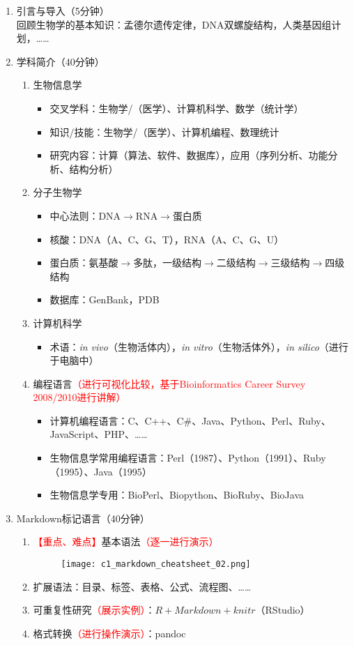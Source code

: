 \documentclass{TIJMUjiaoanLL}
\begin{document}
\begin{enumerate}
  \item 引言与导入（5分钟）
    \\回顾生物学的基本知识：孟德尔遗传定律，DNA双螺旋结构，人类基因组计划，……
  \item 学科简介（40分钟）
    \begin{enumerate}
      \item 生物信息学
	\begin{itemize}
    \item 交叉学科：生物学/（医学）、计算机科学、数学（统计学）
	  \item 知识/技能：生物学/（医学）、计算机编程、数理统计
	  \item 研究内容：计算（算法、软件、数据库），应用（序列分析、功能分析、结构分析）
	\end{itemize}
      \item 分子生物学
	\begin{itemize}
	  \item 中心法则：DNA$\rightarrow$RNA$\rightarrow$蛋白质
	  \item 核酸：DNA（A、C、G、T），RNA（A、C、G、U）
	  \item 蛋白质：氨基酸$\rightarrow$多肽，一级结构$\rightarrow$二级结构$\rightarrow$三级结构$\rightarrow$四级结构
	  \item 数据库：GenBank，PDB
	\end{itemize}
      \item 计算机科学
	\begin{itemize}
	  \item 术语：\textit{in vivo}（生物活体内），\textit{in vitro}（生物活体外），\textit{in silico}（进行于电脑中）
	\end{itemize}
      \item 编程语言\textcolor{red}{（进行可视化比较，基于Bioinformatics Career Survey 2008/2010进行讲解）}
	\begin{itemize}
	  \item 计算机编程语言：C、C++、C\#、Java、Python、Perl、Ruby、JavaScript、PHP、……
	  \item 生物信息学常用编程语言：Perl（1987）、Python（1991）、Ruby（1995）、Java（1995）
	  \item 生物信息学专用：BioPerl、Biopython、BioRuby、BioJava
	\end{itemize}
    \end{enumerate}
  \item Markdown标记语言（40分钟）
    \begin{enumerate}
      \item \textcolor{red}{【重点、难点】}基本语法\textcolor{red}{（逐一进行演示）}
	\begin{figure}[h]
	  \centering
	  \texttt{[image: c1\_markdown\_cheatsheet\_02.png]}
	\end{figure}
      \item 扩展语法：目录、标签、表格、公式、流程图、……
      \item 可重复性研究\textcolor{red}{（展示实例）}：$R+Markdown+knitr$（RStudio）
      \item 格式转换\textcolor{red}{（进行操作演示）}：pandoc
    \end{enumerate}


\end{enumerate}
\end{document}
